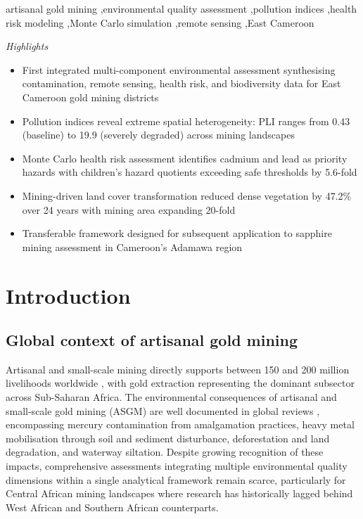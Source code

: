 \documentclass[preprint,12pt,authoryear]{elsarticle}
\begin{document}
\begin{frontmatter}
\begin{abstract}
\end{abstract}

\begin{keyword}
artisanal gold mining \sep environmental quality assessment \sep pollution indices \sep health risk modeling \sep Monte Carlo simulation \sep remote sensing \sep East Cameroon
\end{keyword}

\end{frontmatter}

\begin{center}
\textit{Highlights}
\end{center}

\begin{itemize}
\item First integrated multi-component environmental assessment synthesising contamination, remote sensing, health risk, and biodiversity data for East Cameroon gold mining districts
\item Pollution indices reveal extreme spatial heterogeneity: PLI ranges from 0.43 (baseline) to 19.9 (severely degraded) across mining landscapes
\item Monte Carlo health risk assessment identifies cadmium and lead as priority hazards with children's hazard quotients exceeding safe thresholds by 5.6-fold
\item Mining-driven land cover transformation reduced dense vegetation by 47.2\% over 24 years with mining area expanding 20-fold
\item Transferable framework designed for subsequent application to sapphire mining assessment in Cameroon's Adamawa region
\end{itemize}


\section{Introduction}

\subsection{Global context of artisanal gold mining}

Artisanal and small-scale mining directly supports between 150 and 200 million livelihoods worldwide \citep{WorldBank2019}, with gold extraction representing the dominant subsector across Sub-Saharan Africa. The environmental consequences of artisanal and small-scale gold mining (ASGM) are well documented in global reviews \citep{Spiegel2005, Obrist2018, Esdaile2018}, encompassing mercury contamination from amalgamation practices, heavy metal mobilisation through soil and sediment disturbance, deforestation and land degradation, and waterway siltation. Despite growing recognition of these impacts, comprehensive assessments integrating multiple environmental quality dimensions within a single analytical framework remain scarce, particularly for Central African mining landscapes where research has historically lagged behind West African and Southern African counterparts.
\end{document}
